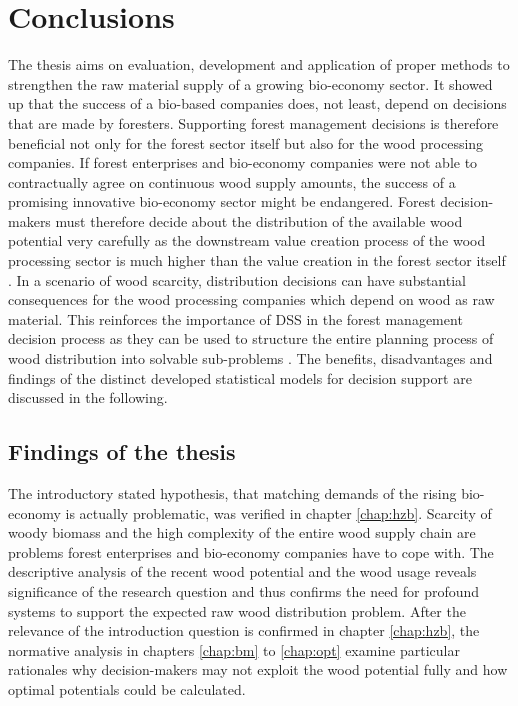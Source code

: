 \chapter{Conclusions}
\label{chap:discussion}
\newpage
\noindent
The thesis aims on evaluation, development and application of proper methods to strengthen the raw material supply of a growing bio-economy sector. It showed up that the success of a bio-based companies does, not least, depend on decisions that are made by foresters. Supporting forest management decisions is therefore beneficial not only for the forest sector itself but also for the wood processing companies. If forest enterprises and bio-economy companies were not able to contractually agree on continuous wood supply amounts, the success of a promising innovative bio-economy sector might be endangered. Forest decision-makers must therefore decide about the distribution of the available wood potential very carefully as the downstream value creation process of the wood processing sector is much higher than the value creation in the forest sector itself \citep[p. 221, 223]{elchichakli_2016}. In a scenario of wood scarcity, distribution decisions can have substantial consequences for the wood processing companies which depend on wood as raw material. This reinforces the importance of DSS in the forest management decision process as they can be used to structure the entire planning process of wood distribution into solvable sub-problems \citep[p. 1065-1067]{pretzsch_2008}. The benefits, disadvantages and findings of the distinct developed statistical models for decision support are discussed in the following.

\section{Findings of the thesis}
\label{sec:discussion:findings}
The introductory stated hypothesis, that matching demands of the rising bio-economy is actually problematic, was verified in chapter \ref{chap:hzb}. Scarcity of woody biomass and the high complexity of the entire wood supply chain are problems forest enterprises and bio-economy companies have to cope with. The descriptive analysis of the recent wood potential and the wood usage reveals significance of the research question and thus confirms the need for profound systems to support the expected raw wood distribution problem. After the relevance of the introduction question is confirmed in chapter \ref{chap:hzb}, the normative analysis in chapters \ref{chap:bm} to \ref{chap:opt} examine particular rationales why decision-makers may not exploit the wood potential fully and how optimal potentials could be calculated.

